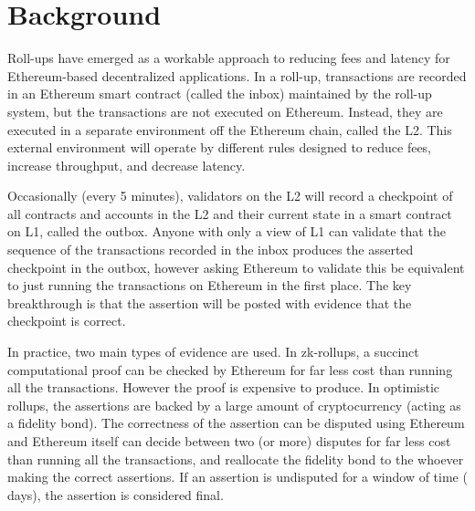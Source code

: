 
\section{Background} 

Roll-ups have emerged as a workable approach to reducing fees and latency for Ethereum-based decentralized applications. In a roll-up, transactions are recorded in an Ethereum smart contract (called the inbox) maintained by the roll-up system, but the transactions are not executed on Ethereum. Instead, they are executed in a separate environment off the Ethereum chain, called the L2. This external environment will operate by different rules designed to reduce fees, increase throughput, and decrease latency. 

Occasionally (\eg every 5 minutes), validators on the L2 will record a checkpoint of all contracts and accounts in the L2 and their current state in a smart contract on L1, called the outbox. Anyone with only a view of L1 can validate that the sequence of the transactions recorded in the inbox produces the asserted checkpoint in the outbox, however asking Ethereum to validate this be equivalent to just running the transactions on Ethereum in the first place. The key breakthrough is that the assertion will be posted with evidence that the checkpoint is correct.

In practice, two main types of evidence are used. In zk-rollups, a succinct computational proof can be checked by Ethereum for far less cost than running all the transactions. However the proof is expensive to produce. In optimistic rollups, the assertions are backed by a large amount of cryptocurrency (acting as a fidelity bond). The correctness of the assertion can be disputed using Ethereum and Ethereum itself can decide between two (or more) disputes for far less cost than running all the transactions, and reallocate the fidelity bond to the whoever making the correct assertions. If an assertion is undisputed for a window of time ( days), the assertion is considered final.

